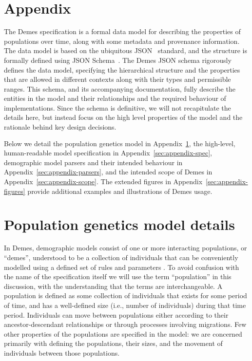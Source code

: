 \documentclass[11pt]{article}
\begin{document}



\renewcommand{\thefigure}{A\arabic{figure}}
\renewcommand{\thetable}{A\arabic{table}}
\renewcommand{\theequation}{A\arabic{equation}}
\renewcommand{\thesection}{A\arabic{section}}
\setcounter{figure}{0}
\setcounter{table}{0}
\setcounter{equation}{0}

\section*{Appendix}

The Demes specification is a formal data model for describing
the properties of populations over time,
along with some metadata and provenance information.
The data model is based on the ubiquitous JSON~\citep{bray2017javascript}
standard, and the structure is formally defined using
JSON Schema~\citep{wright2020json}.
The Demes JSON schema rigorously defines the data model,
specifying the hierarchical structure and the properties that are allowed in different
contexts along with their types and permissible ranges.
This schema, and its accompanying documentation,
fully describe the entities in the model and their
relationships and the required behaviour of implementations.
Since the schema is definitive,
we will not recapitulate the details
here, but instead focus on the high level properties of the model and
the rationale behind key design decisions.

Below we detail the population genetics model in 
Appendix~\ref{sec:appendix-pop-gen-model},
the high-level, human-readable model specification in
Appendix~\ref{sec:appendix-spec}, demographic model parsers and their
intended behaviour in Appendix~\ref{sec:appendix-parsers}, and the
intended scope of Demes in Appendix~\ref{sec:appendix-scope}.
The extended figures in Appendix~\ref{sec:appendix-figures} provide
additional examples and illustrations of Demes usage.

\section{Population genetics model details}
\label{sec:appendix-pop-gen-model}

In Demes, demographic models consist of one or more interacting populations,
or ``demes'', understood to be a collection of individuals that can be
conveniently modelled using a defined set of rules and parameters
\citep{gilmour_demes_1939,gilmour_deme_1955}.
To avoid confusion with the name of the specification itself we will
use the term ``population'' in this discussion, with the understanding that the
terms are interchangeable.
A population is defined as some collection of individuals that exists for
some period of time, and has a well-defined size (i.e., number of individuals)
during that time period. Individuals can move between populations
either according to their ancestor-descendant relationships
or through processes involving migrations.
Few other properties of the populations are specified in the model:
we are concerned primarily with defining the populations, their sizes, and the
movement of individuals between those populations.
\end{document}
